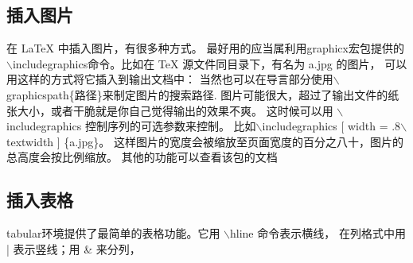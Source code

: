\documentclass{thesis}
\begin{document}
\subsection{插入图片}
在 LaTeX 中插入图片，有很多种方式。
最好用的应当属利用graphicx宏包提供的
$\backslash$includegraphics命令。比如在 TeX 源文件同目录下，有名为 a.jpg 的图片，
可以用这样的方式将它插入到输出文档中：
当然也可以在导言部分使用$\backslash$graphicspath\{路径\}来制定图片的搜索路径.
图片可能很大，超过了输出文件的纸张大小，或者干脆就是你自己觉得输出的效果不爽。
这时候可以用 $\backslash$includegraphics 控制序列的可选参数来控制。
比如$\backslash$includegraphics [ width = .8$\backslash$ textwidth ] \{a.jpg\}。
这样图片的宽度会被缩放至页面宽度的百分之八十，图片的总高度会按比例缩放。
其他的功能可以查看该包的文档\\
\subsection{插入表格}
tabular环境提供了最简单的表格功能。它用 $\backslash$hline 命令表示横线，
在列格式中用 | 表示竖线；用 \& 来分列，
\end{document}
